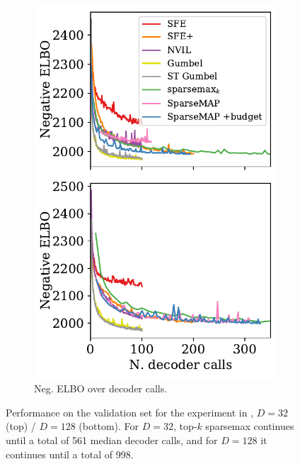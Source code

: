 \begin{figure}[ht]
\begin{subfigure}[b]{0.49\textwidth}
        \includegraphics[width=\textwidth]{Figures/elbo-calls.pdf}
        \caption{Neg. ELBO over decoder calls.}
        \label{fig:elbo_bit_calls}
    \end{subfigure}
    \caption[Performance on the validation set
        for the experiment in .]{Performance on the validation set
        for the experiment in ,
        $D=32$ (top) / $D=128$ (bottom). For $D=32$, top-$k$ sparsemax continues
        until a total of 561 median decoder calls, and for $D=128$ it continues
        until a total of 998.}
    \label{fig:elbo_bit}
\end{figure}

